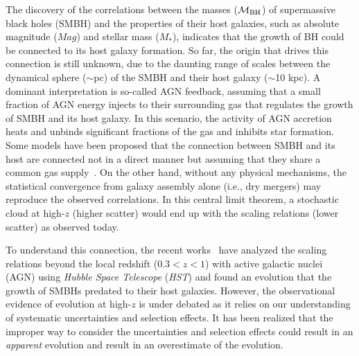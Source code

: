 \documentclass{natureprintstyle}
\newcommand{\mbh}{$\mathcal M_{\rm BH}$}
\newcommand{\mstar}{{$M_*$}}
\begin{document}
The discovery of the correlations between the masses (\mbh) of supermassive black holes (SMBH) and the properties of their host galaxies, such as absolute magnitude ($Mag$) and stellar mass (\mstar), indicates that the growth of BH could be connected to its host galaxy formation. So far, the origin that drives this connection is still unknown, due to the daunting range of scales between the dynamical sphere ($\sim$pc) of the SMBH and their host galaxy ($\sim$10 kpc). A dominant interpretation is so-called AGN feedback, assuming that a small fraction of AGN energy injects to their surrounding gas that regulates the growth of SMBH and its host galaxy. In this scenario, the activity of AGN accretion heats and unbinds significant fractions of the gas and inhibits star formation. Some models have been proposed that the connection between SMBH and its host are connected not in a direct manner but assuming that they share a common gas supply~\cite{Cen2015, Menci2016}. On the other hand, without any physical mechanisms, the statistical convergence from galaxy assembly alone (i.e., dry mergers) may reproduce the observed correlations. In this central limit theorem, a stochastic cloud at high-$z$ (higher scatter) would end up with the scaling relations (lower scatter) as observed today.

To understand this connection, the recent works~\cite{Park15, Tre++07, Bennert11, Woo++08} have analyzed the scaling relations beyond the local redshift {($0.3<z<1$)} with active galactic nuclei (AGN) using {\it Hubble Space Telescope} ({\it HST}) and found an evolution that the growth of SMBHs predated to their host galaxies. However, the observational evidence of evolution at high-$z$ is under debated as it relies on our understanding of systematic uncertainties and selection effects. It has been realized that the improper way to consider the uncertainties and selection effects could result in an {\it apparent} evolution and result in an overestimate of the evolution\cite{Volonteri2011}.
\end{document}
